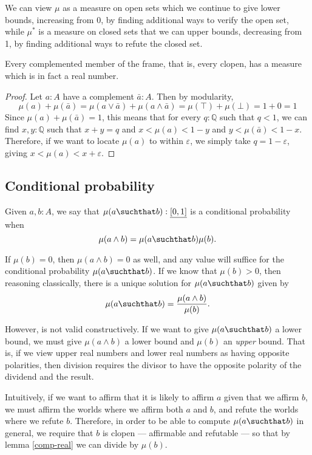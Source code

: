 We can view $\mu$ as a measure on open sets which we continue to give lower bounds, increasing from 0, by finding additional ways to verify the open set, while $\mu^*$ is a measure on closed sets that we can upper bounds, decreasing from 1, by finding additional ways to refute the closed set.

\begin{lemma}
\label{comp-real}
Every complemented member of the frame, that is, every clopen, has a measure which is in fact a real number.
\end{lemma}
\begin{proof}
Let $a : A$ have a complement $\bar{a} : A$. Then by modularity, 
\[
\mu(a) + \mu(\bar{a}) = \mu(a \vee \bar{a}) + \mu(a \wedge \bar{a}) = \mu(\top) + \mu(\bot) = 1 + 0 = 1
\]
Since $\mu(a) + \mu(\bar{a}) = 1$, this means that for every $q : \mathbb{Q}$ such that $q < 1$, we can find $x, y : \mathbb{Q}$ such that $x + y = q$ and $x < \mu(a) < 1 - y$ and $y < \mu(\bar{a}) < 1 - x$. Therefore, if we want to locate $\mu(a)$ to within $\varepsilon$, we simply take $q = 1 - \varepsilon$, giving $x < \mu(a) < x + \varepsilon$.
\end{proof}

\subsection{Conditional probability}

Given $a, b : A$, we say that $\mu(a \suchthat b) : \underline{[0,1]}$ is a conditional probability when
\[
\mu(a \wedge b) = \mu(a \suchthat b) \mu(b).
\]

If $\mu(b) = 0$, then $\mu(a \wedge b) = 0$ as well, and any value will suffice for the conditional probability $\mu(a \suchthat b)$. If we know that $\mu(b) > 0$, then reasoning classically, there is a unique solution for $\mu(a \suchthat b)$ given by
\[
\mu(a \suchthat b) = \frac{\mu(a \wedge b)}{\mu(b)}.
\]

However, is not valid constructively. If we want to give $\mu(a \suchthat b)$ a lower bound, we must give $\mu(a \wedge b)$ a lower bound and $\mu(b)$ an \emph{upper} bound. That is, if we view upper real numbers and lower real numbers as having opposite polarities, then division requires the divisor to have the opposite polarity of the dividend and the result.

Intuitively, if we want to affirm that it is likely to affirm $a$ given that we affirm $b$, we must affirm the worlds where we affirm both $a$ and $b$, and refute the worlds where we refute $b$. Therefore, in order to be able to compute $\mu(a \suchthat b)$ in general, we require that $b$ is clopen --- affirmable and refutable --- so that by lemma \ref{comp-real} we can divide by $\mu(b)$.

